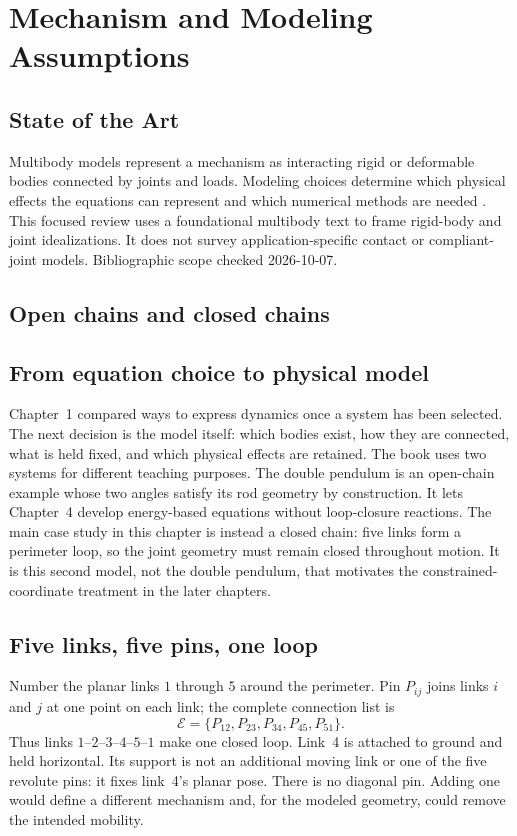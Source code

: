 \documentclass[../main.tex]{subfiles}
\begin{document}
\chapter{Mechanism and Modeling Assumptions}
\label{chap:mechanism}

\section{State of the Art}
Multibody models represent a mechanism as interacting rigid or deformable bodies connected by joints and loads. Modeling choices determine which physical effects the equations can represent and which numerical methods are needed \cite{shabana2013dynamics}. This focused review uses a foundational multibody text to frame rigid-body and joint idealizations. It does not survey application-specific contact or compliant-joint models. Bibliographic scope checked 2026-10-07.

\section{Open chains and closed chains}

\section{From equation choice to physical model}

Chapter~1 compared ways to express dynamics once a system has been selected. The next decision is the model itself: which bodies exist, how they are connected, what is held fixed, and which physical effects are retained. The book uses two systems for different teaching purposes. The double pendulum is an open-chain example whose two angles satisfy its rod geometry by construction. It lets Chapter~4 develop energy-based equations without loop-closure reactions. The main case study in this chapter is instead a closed chain: five links form a perimeter loop, so the joint geometry must remain closed throughout motion. It is this second model, not the double pendulum, that motivates the constrained-coordinate treatment in the later chapters.

\section{Five links, five pins, one loop}

Number the planar links $1$ through $5$ around the perimeter. Pin $P_{ij}$ joins links $i$ and $j$ at one point on each link; the complete connection list is
\begin{equation}
\mathcal{E}=\{P_{12},P_{23},P_{34},P_{45},P_{51}\}.
\label{eq:five-link-topology}
\end{equation}
Thus links $1$--$2$--$3$--$4$--$5$--$1$ make one closed loop. Link~4 is attached to ground and held horizontal. Its support is not an additional moving link or one of the five revolute pins: it fixes link~4's planar pose. There is no diagonal pin. Adding one would define a different mechanism and, for the modeled geometry, could remove the intended mobility.
\end{document}

